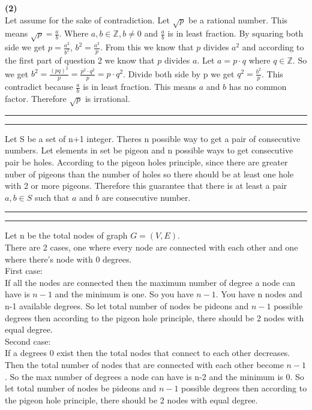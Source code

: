 \documentclass[a4paper, 11pt]{article}
\newcommand{\question}[2] {\vspace{.25in} \hrule\vspace{0.5em}
\noindent{\bf #1: #2} \vspace{0.5em}
\hrule \vspace{.10in}}
\renewcommand{\part}[1] {\vspace{.10in} {\bf (#1)}}
\begin{document}
\part{2}\\
Let assume for the sake of contradiction. Let $\sqrt{p}$ be a rational number. This means $\sqrt{p} = \frac{a}{b}$. Where $a,b \in \mathbb{Z}, b \neq 0$ and $\frac{a}{b}$ is in least fraction. By squaring both side we get $p = \frac{a^2}{b^2}$, $b^2 = \frac{a^2}{p}$. From this we know that $p$ divides $a^2$ and according to the first part of question 2 we know that $p$ divides $a$. Let $a = p \cdot q$ where $q \in \mathbb{Z}$. So we get $b^2 = \frac{(pq)^2}{p} = \frac{p^2 \cdot q^2}{p} = p \cdot q^2$. Divide both side by p we get $q^2 = \frac{b^2}{p}$. This contradict because $\frac{a}{b}$ is in least fraction. This means $a$ and $b$ has no common factor. Therefore $\sqrt{p}$ is irrational.

\question{3}{Spacing}
Let S be a set of n+1 integer. Theres n possible way to get a pair of consecutive numbers. Let elements in set be pigeon and n possible ways to get consecutive pair be holes. According to the pigeon holes principle, since there are greater nuber of pigeons than the number of holes so there should be at least one hole with 2 or more pigeons. Therefore this guarantee that there is at least a pair $a,b \in S$ such that $a$ and $b$ are consecutive number.

\question{4}{Curious fact about graph}
Let n be the total nodes of graph $G = (V,E)$.\\
There are 2 cases, one where every node are connected with each other and one where there's node with 0 degrees.\\
First case:\\
If all the nodes are connected then the maximum number of degree a node can have is $n-1$ and the minimum is one. So you have $n-1$. You have n nodes and n-1 available degrees. So let total number of nodes be pideons and $n-1$ possible degrees then according to the pigeon hole principle, there should be 2 nodes with equal degree.\\
Second case:\\
 If a degrees 0 exist then the total nodes that connect to each other decreases. Then the total number of nodes that are connected with each other become $n-1$. So the max number of degrees a node can have is n-2 and the minimum is 0. So let total number of nodes be pideons and $n-1$ possible degrees then according to the pigeon hole principle, there should be 2 nodes with equal degree.\\
 
\end{document}
